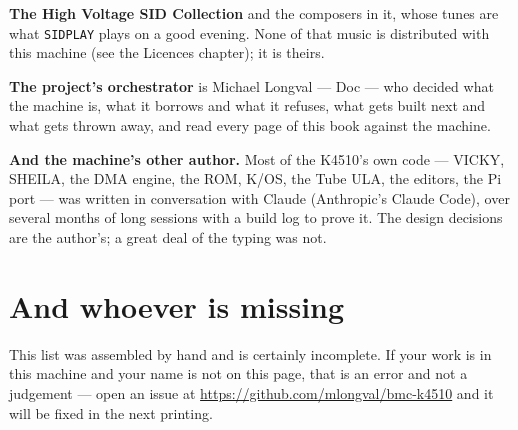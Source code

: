 \textbf{The High Voltage SID Collection} and the composers in it, whose
tunes are what \verb|SIDPLAY| plays on a good evening. None of that
music is distributed with this machine (see
the Licences chapter); it is theirs.

\begin{aside}
\textbf{The project's orchestrator} is Michael Longval --- Doc --- who
decided what the machine is, what it borrows and what it refuses, what
gets built next and what gets thrown away, and read every page of this
book against the machine.

\textbf{And the machine's other author.} Most of the K4510's own code
--- VICKY, SHEILA, the DMA engine, the ROM, K/OS, the Tube ULA, the
editors, the Pi port --- was written in conversation with Claude
(Anthropic's Claude Code), over several months of long sessions with a
build log to prove it. The design decisions are the author's; a great
deal of the typing was not.
\end{aside}

\section{And whoever is missing}
This list was assembled by hand and is certainly incomplete. If your
work is in this machine and your name is not on this page, that is an
error and not a judgement --- open an issue at
\url{https://github.com/mlongval/bmc-k4510} and it will be fixed in the
next printing.
\endgroup
